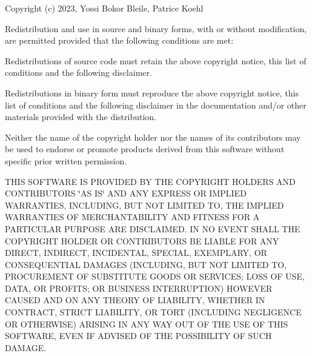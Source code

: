 Copyright (c) 2023, Yossi Bokor Bleile, Patrice Koehl

Redistribution and use in source and binary forms, with or without modification, are permitted provided that the following conditions are met\+:


\begin{DoxyEnumerate}
\item Redistributions of source code must retain the above copyright notice, this list of conditions and the following disclaimer.
\item Redistributions in binary form must reproduce the above copyright notice, this list of conditions and the following disclaimer in the documentation and/or other materials provided with the distribution.
\item Neither the name of the copyright holder nor the names of its contributors may be used to endorse or promote products derived from this software without specific prior written permission.
\end{DoxyEnumerate}

THIS SOFTWARE IS PROVIDED BY THE COPYRIGHT HOLDERS AND CONTRIBUTORS \char`\"{}\+AS IS\char`\"{} AND ANY EXPRESS OR IMPLIED WARRANTIES, INCLUDING, BUT NOT LIMITED TO, THE IMPLIED WARRANTIES OF MERCHANTABILITY AND FITNESS FOR A PARTICULAR PURPOSE ARE DISCLAIMED. IN NO EVENT SHALL THE COPYRIGHT HOLDER OR CONTRIBUTORS BE LIABLE FOR ANY DIRECT, INDIRECT, INCIDENTAL, SPECIAL, EXEMPLARY, OR CONSEQUENTIAL DAMAGES (INCLUDING, BUT NOT LIMITED TO, PROCUREMENT OF SUBSTITUTE GOODS OR SERVICES; LOSS OF USE, DATA, OR PROFITS; OR BUSINESS INTERRUPTION) HOWEVER CAUSED AND ON ANY THEORY OF LIABILITY, WHETHER IN CONTRACT, STRICT LIABILITY, OR TORT (INCLUDING NEGLIGENCE OR OTHERWISE) ARISING IN ANY WAY OUT OF THE USE OF THIS SOFTWARE, EVEN IF ADVISED OF THE POSSIBILITY OF SUCH DAMAGE. 